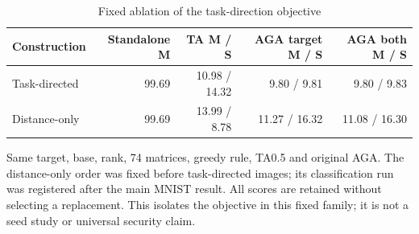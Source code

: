 \begin{table}[!htbp]
\centering
\small
\caption{Fixed ablation of the task-direction objective}
\label{tab:distance_ablation}
\begin{tabular}{lrrrr}
\toprule
Construction & Standalone M & TA M / S & AGA target M / S & AGA both M / S \\
\midrule
Task-directed & 99.69 & 10.98 / 14.32 & 9.80 / 9.81 & 9.80 / 9.83 \\
Distance-only & 99.69 & 13.99 / 8.78 & 11.27 / 16.32 & 11.08 / 16.30 \\
\bottomrule
\end{tabular}
\par\vspace{3pt}\begin{minipage}{0.98\linewidth}\footnotesize Same target, base, rank, 74 matrices, greedy rule, TA0.5 and original AGA. The distance-only order was fixed before task-directed images; its classification run was registered after the main MNIST result. All scores are retained without selecting a replacement. This isolates the objective in this fixed family; it is not a seed study or universal security claim.\end{minipage}
\end{table}

